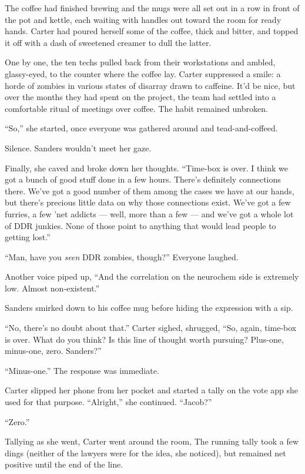 The coffee had finished brewing and the mugs were all set out in a row in front of the pot and kettle, each waiting with handles out toward the room for ready hands. Carter had poured herself some of the coffee, thick and bitter, and topped it off with a dash of sweetened creamer to dull the latter.

One by one, the ten techs pulled back from their workstations and ambled, glassy-eyed, to the counter where the coffee lay. Carter suppressed a smile: a horde of zombies in various states of disarray drawn to caffeine. It'd be nice, but over the months they had spent on the project, the team had settled into a comfortable ritual of meetings over coffee. The habit remained unbroken.

``So,'' she started, once everyone was gathered around and tead-and-coffeed.

Silence. Sanders wouldn't meet her gaze.

Finally, she caved and broke down her thoughts. ``Time-box is over. I think we got a bunch of good stuff done in a few hours. There's definitely connections there. We've got a good number of them among the cases we have at our hands, but there's precious little data on why those connections exist. We've got a few furries, a few 'net addicts --- well, more than a few --- and we've got a whole lot of DDR junkies. None of those point to anything that would lead people to getting lost.''

``Man, have you \emph{seen} DDR zombies, though?'' Everyone laughed.

Another voice piped up, ``And the correlation on the neurochem side is extremely low. Almost non-existent.''

Sanders smirked down to his coffee mug before hiding the expression with a sip.

``No, there's no doubt about that.'' Carter sighed, shrugged, ``So, again, time-box is over. What do you think? Is this line of thought worth pursuing? Plus-one, minus-one, zero. Sanders?''

``Minus-one.'' The response was immediate.

Carter slipped her phone from her pocket and started a tally on the vote app she used for that purpose. ``Alright,'' she continued. ``Jacob?''

``Zero.''

Tallying as she went, Carter went around the room, The running tally took a few dings (neither of the lawyers were for the idea, she noticed), but remained net positive until the end of the line.

